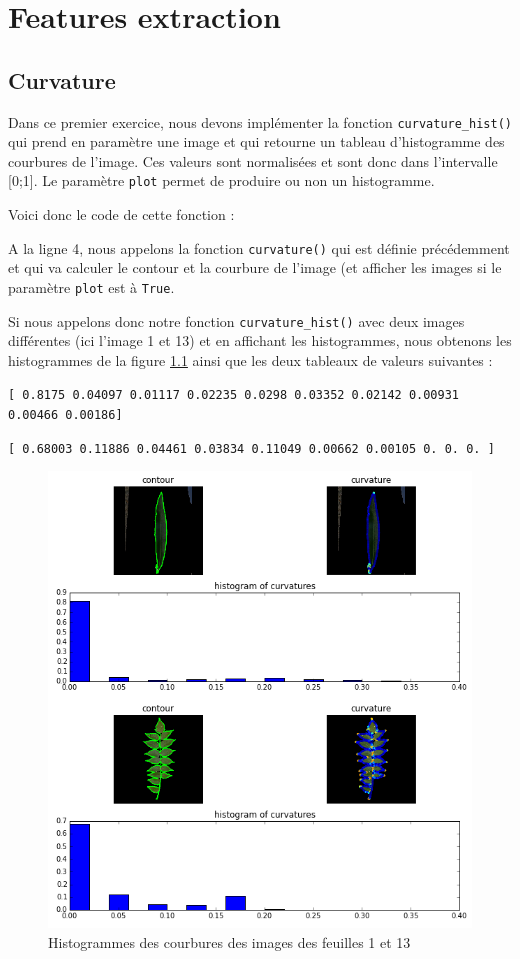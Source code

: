 \chapter{Features extraction}
\section{Curvature}

Dans ce premier exercice, nous devons implémenter la fonction \texttt{curvature\_hist()} qui prend en paramètre une image et qui retourne un tableau d'histogramme des courbures de l'image. Ces valeurs sont normalisées et sont donc dans l'intervalle [0;1]. Le paramètre \texttt{plot} permet de produire ou non un histogramme.

Voici donc le code de cette fonction :



A la ligne 4, nous appelons la fonction \texttt{curvature()} qui est définie précédemment et qui va calculer le contour et la courbure de l'image (et afficher les images si le paramètre \texttt{plot} est à \texttt{True}.


Si nous appelons donc notre fonction \texttt{curvature\_hist()} avec deux images différentes (ici l'image 1 et 13) et en affichant les histogrammes, nous obtenons les histogrammes de la figure \ref{curvaturehist} ainsi que les deux tableaux de valeurs suivantes :

\vspace{0.6cm}
\small\texttt{[ 0.8175   0.04097  0.01117  0.02235  0.0298   0.03352  0.02142  0.00931  0.00466  0.00186]}

\small\texttt{[ 0.68003  0.11886  0.04461  0.03834  0.11049  0.00662  0.00105  0.       0.       0.     ]}
\vspace{0.6cm}

\begin{figure}[h]
  \centering
    \includegraphics[width=0.6\linewidth]{img/curvatureHist.png}
  \caption{Histogrammes des courbures des images des feuilles 1 et 13}
  \label{curvaturehist}
\end{figure}


